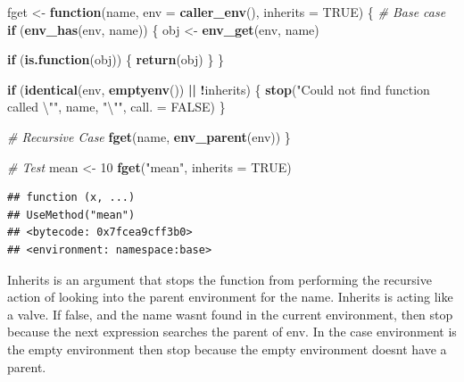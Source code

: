 \documentclass[]{book}
\newenvironment{Shaded}{\begin{snugshade}}{\end{snugshade}}
\newcommand{\CharTok}[1]{\textcolor[rgb]{0.31,0.60,0.02}{#1}}
\newcommand{\CommentTok}[1]{\textcolor[rgb]{0.56,0.35,0.01}{\textit{#1}}}
\newcommand{\ControlFlowTok}[1]{\textcolor[rgb]{0.13,0.29,0.53}{\textbf{#1}}}
\newcommand{\DataTypeTok}[1]{\textcolor[rgb]{0.13,0.29,0.53}{#1}}
\newcommand{\DecValTok}[1]{\textcolor[rgb]{0.00,0.00,0.81}{#1}}
\newcommand{\KeywordTok}[1]{\textcolor[rgb]{0.13,0.29,0.53}{\textbf{#1}}}
\newcommand{\NormalTok}[1]{#1}
\newcommand{\OperatorTok}[1]{\textcolor[rgb]{0.81,0.36,0.00}{\textbf{#1}}}
\newcommand{\OtherTok}[1]{\textcolor[rgb]{0.56,0.35,0.01}{#1}}
\newcommand{\StringTok}[1]{\textcolor[rgb]{0.31,0.60,0.02}{#1}}
\begin{document}
\begin{Shaded}
\begin{Highlighting}[]
\NormalTok{fget <-}\StringTok{ }\ControlFlowTok{function}\NormalTok{(name, }\DataTypeTok{env =} \KeywordTok{caller_env}\NormalTok{(), }\DataTypeTok{inherits =} \OtherTok{TRUE}\NormalTok{) \{}
  \CommentTok{# Base case}
  \ControlFlowTok{if}\NormalTok{ (}\KeywordTok{env_has}\NormalTok{(env, name)) \{}
\NormalTok{    obj <-}\StringTok{ }\KeywordTok{env_get}\NormalTok{(env, name)}

    \ControlFlowTok{if}\NormalTok{ (}\KeywordTok{is.function}\NormalTok{(obj)) \{}
      \KeywordTok{return}\NormalTok{(obj)}
\NormalTok{    \}}
\NormalTok{  \}}

  \ControlFlowTok{if}\NormalTok{ (}\KeywordTok{identical}\NormalTok{(env, }\KeywordTok{emptyenv}\NormalTok{()) }\OperatorTok{||}\StringTok{ }\OperatorTok{!}\NormalTok{inherits) \{}
    \KeywordTok{stop}\NormalTok{(}\StringTok{"Could not find function called }\CharTok{\textbackslash{}"}\StringTok{"}\NormalTok{, name, }\StringTok{"}\CharTok{\textbackslash{}"}\StringTok{"}\NormalTok{, }\DataTypeTok{call. =} \OtherTok{FALSE}\NormalTok{)}
\NormalTok{  \}}

  \CommentTok{# Recursive Case}
  \KeywordTok{fget}\NormalTok{(name, }\KeywordTok{env_parent}\NormalTok{(env))}
\NormalTok{\}}
\end{Highlighting}
\end{Shaded}

\begin{Shaded}
\begin{Highlighting}[]
\CommentTok{# Test}
\NormalTok{mean <-}\StringTok{ }\DecValTok{10}
\KeywordTok{fget}\NormalTok{(}\StringTok{"mean"}\NormalTok{, }\DataTypeTok{inherits =} \OtherTok{TRUE}\NormalTok{)}
\end{Highlighting}
\end{Shaded}

\begin{verbatim}
## function (x, ...) 
## UseMethod("mean")
## <bytecode: 0x7fcea9cff3b0>
## <environment: namespace:base>
\end{verbatim}

Inherits is an argument that stops the function from performing the recursive action of looking into the parent environment for the name. Inherits is acting like a valve. If false, and the name wasnt found in the current environment, then stop because the next expression searches the parent of env. In the case environment is the empty environment then stop because the empty environment doesnt have a parent.
\end{document}
